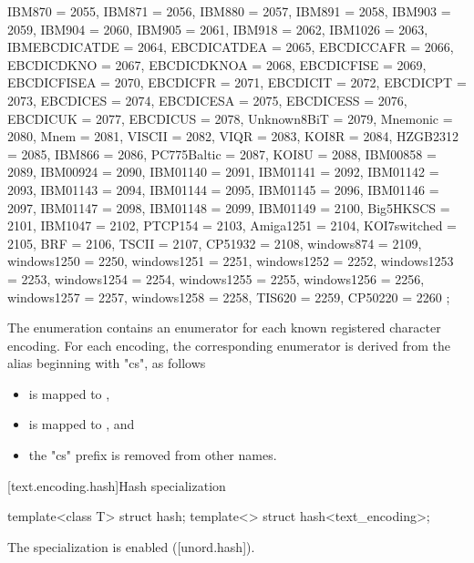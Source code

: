 \documentclass{wg21}
\begin{document}
\begin{addedblock}
\begin{codeblock}
{        IBM870 = 2055,
        IBM871 = 2056,
        IBM880 = 2057,
        IBM891 = 2058,
        IBM903 = 2059,
        IBM904 = 2060,
        IBM905 = 2061,
        IBM918 = 2062,
        IBM1026 = 2063,
        IBMEBCDICATDE = 2064,
        EBCDICATDEA = 2065,
        EBCDICCAFR = 2066,
        EBCDICDKNO = 2067,
        EBCDICDKNOA = 2068,
        EBCDICFISE = 2069,
        EBCDICFISEA = 2070,
        EBCDICFR = 2071,
        EBCDICIT = 2072,
        EBCDICPT = 2073,
        EBCDICES = 2074,
        EBCDICESA = 2075,
        EBCDICESS = 2076,
        EBCDICUK = 2077,
        EBCDICUS = 2078,
        Unknown8BiT = 2079,
        Mnemonic = 2080,
        Mnem = 2081,
        VISCII = 2082,
        VIQR = 2083,
        KOI8R = 2084,
        HZGB2312 = 2085,
        IBM866 = 2086,
        PC775Baltic = 2087,
        KOI8U = 2088,
        IBM00858 = 2089,
        IBM00924 = 2090,
        IBM01140 = 2091,
        IBM01141 = 2092,
        IBM01142 = 2093,
        IBM01143 = 2094,
        IBM01144 = 2095,
        IBM01145 = 2096,
        IBM01146 = 2097,
        IBM01147 = 2098,
        IBM01148 = 2099,
        IBM01149 = 2100,
        Big5HKSCS = 2101,
        IBM1047 = 2102,
        PTCP154 = 2103,
        Amiga1251 = 2104,
        KOI7switched = 2105,
        BRF = 2106,
        TSCII = 2107,
        CP51932 = 2108,
        windows874 = 2109,
        windows1250 = 2250,
        windows1251 = 2251,
        windows1252 = 2252,
        windows1253 = 2253,
        windows1254 = 2254,
        windows1255 = 2255,
        windows1256 = 2256,
        windows1257 = 2257,
        windows1258 = 2258,
        TIS620 = 2259,
        CP50220 = 2260
    };
\end{codeblock}

\begin{note}
    The  enumeration contains an enumerator for each known registered character encoding.
    For each encoding, the corresponding enumerator is derived from the alias beginning with "cs", as follows
    \begin{itemize}
        \item {} is mapped to ,
        \item {} is mapped to , and
        \item the "cs" prefix is removed from other names.
    \end{itemize}
\end{note}


[text.encoding.hash]{Hash specialization}

\begin{itemdecl}
template<class T> struct hash;
template<> struct hash<text_encoding>;
\end{itemdecl}

\begin{itemdescr}
The specialization is enabled ([unord.hash]).
\end{itemdescr}



\end{addedblock}
\end{document}
